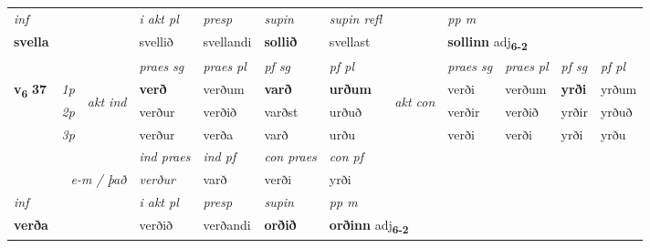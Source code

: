 \begin{longtable}[l]{X>{\footnotesize\itshape}llXXXXlXXXX}
   {\textit{inf}} & &  & \textit{i akt pl}   & \textit{presp} & \textit{supin} & \textit{supin refl} && \textit{pp m} \\*
  {\textbf{svella}} & &  & svellið   & svellandi &  \textbf{sollið} & svellast && \multicolumn{2}{l}{\textbf{sollinn} adj\textbf{\textsubscript{6-2}}} \\*

\midrule

 & &   & \textit{praes sg}  & \textit{praes pl}    & \textit{ pf sg} & \textit{pf pl} & & \textit{praes sg}  & \textit{praes pl}    & \textit{pf sg} & \textit{pf pl }  \\ \cmidrule{4-7} \cmidrule{9-12}
 \multirow{2}{*}{{{\textbf{v{\textsubscript{6}}} \Large{\textbf{37}}}}}  & 1p & \multirow{3}{*}{\begin{turn}{90}\textit{akt ind}\end{turn}} & \textbf{verð} & verðum & \textbf{varð} & \textbf{urðum} & \multirow{3}{*}{\begin{turn}{90}\textit{akt con}\end{turn}} &verði & verðum & \textbf{yrði} & yrðum\\*
 & 2p &  &  verður  & verðið & varðst & urðuð & & verðir & verðið & yrðir & yrðuð \\*
 & 3p &  & verður & verða & varð & urðu & & verði & verði& yrði & yrðu \\*
\cmidrule{4-7} \cmidrule{9-12}

   && &  \textit{ind praes} & \textit{ind pf} & \textit{con praes} & \textit{con pf} \\*
\multicolumn{3}{r}{\textit{e-m / það}} & verður & varð & verði & yrði \\*

\cmidrule{4-7}
   {\textit{inf}} & &  & \textit{i akt pl}   & \textit{presp} & \textit{supin}  & \textit{pp m} \\*
  {\textbf{verða}} & &  & verðið   & verðandi &  \textbf{orðið}  & \multicolumn{2}{l}{\textbf{orðinn} adj\textbf{\textsubscript{6-2}}} \\*

\midrule


\end{longtable}
